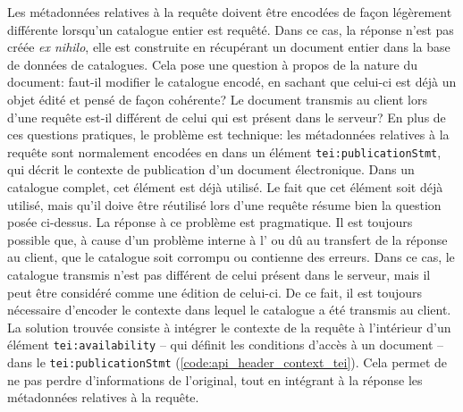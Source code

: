 Les métadonnées relatives à la requête doivent être encodées de façon légèrement différente lorsqu'un catalogue entier est requêté. Dans ce cas, la réponse n'est pas créée \textit{ex nihilo}, elle est construite en récupérant un document entier dans la base de données de catalogues. Cela pose une question à propos de la nature du document: faut-il modifier le catalogue encodé, en sachant que celui-ci est déjà un objet édité et pensé de façon cohérente? Le document transmis au client lors d'une requête est-il différent de celui qui est présent dans le serveur? En plus de ces questions pratiques, le problème est technique: les métadonnées relatives à la requête sont normalement encodées en \tei{} dans un élément \texttt{tei:publicationStmt}, qui décrit le contexte de publication d'un document électronique. Dans un catalogue complet, cet élément est déjà utilisé. Le fait que cet élément soit déjà utilisé, mais qu'il doive être réutilisé lors d'une requête résume bien la question posée ci-dessus. La réponse à ce problème est pragmatique. Il est toujours possible que, à cause d'un problème interne à l'\api{} ou dû au transfert de la réponse au client, que le catalogue soit corrompu ou contienne des erreurs. Dans ce cas, le catalogue transmis n'est pas différent de celui présent dans le serveur, mais il peut être considéré comme une édition de celui-ci. De ce fait, il est toujours nécessaire d'encoder le contexte dans lequel le catalogue a été transmis au client. La solution trouvée consiste à intégrer le contexte de la requête à l'intérieur d'un élément \texttt{tei:availability} -- qui définit les conditions d'accès à un document -- dans le \texttt{tei:publicationStmt} (\ref{code:api_header_context_tei}). Cela permet de ne pas perdre d'informations de l'original, tout en intégrant à la réponse les métadonnées relatives à la requête.

